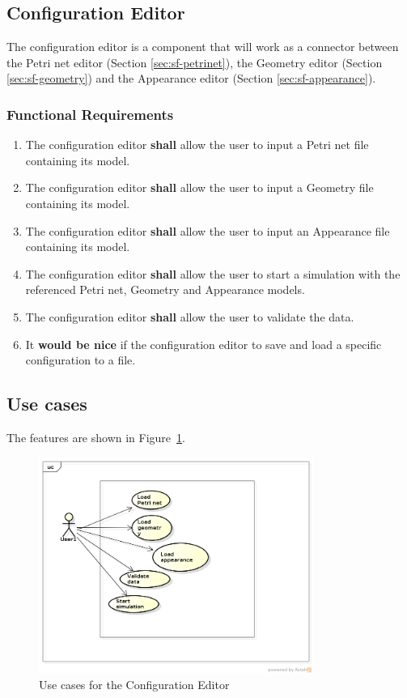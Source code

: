 \subsection{Configuration Editor}

The configuration editor is a component that will work as a connector between the Petri net editor (Section \ref{sec:sf-petrinet}), the Geometry editor (Section \ref{sec:sf-geometry}) and the Appearance editor (Section \ref{sec:sf-appearance}). 

\subsubsection{Functional Requirements}

\begin{enumerate}
	\item The configuration editor \textbf{shall} allow the user to input a Petri net file containing its model.
	\item The configuration editor \textbf{shall} allow the user to input a Geometry file containing its model.
	\item The configuration editor \textbf{shall} allow the user to input an Appearance file containing its model.
	\item The configuration editor \textbf{shall} allow the user to start a simulation with the referenced Petri net, Geometry and Appearance models.
	\item The configuration editor \textbf{shall} allow the user to validate the data.
	\item It \textbf{would be nice} if the configuration editor to save and load a specific configuration to a file.
\end{enumerate}

\subsection{Use cases}

The features are shown in Figure~\ref{fig:use-cases-configuration}.

\begin{figure}[htp]
\begin{center}
  \includegraphics[width=0.8\textwidth]{image/uc-configuration.png}
  \caption{Use cases for the Configuration Editor}
  \label{fig:use-cases-configuration}
\end{center}
\end{figure}